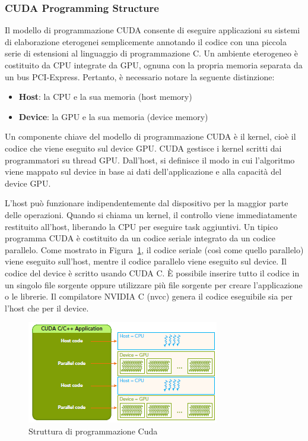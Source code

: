 \subsubsection{CUDA Programming Structure}
Il modello di programmazione CUDA consente di eseguire applicazioni su sistemi di elaborazione eterogenei semplicemente annotando il codice con una piccola serie di estensioni al linguaggio di programmazione C. Un ambiente eterogeneo è costituito da CPU integrate da GPU, ognuna con la propria memoria separata da un bus PCI-Express. Pertanto, è necessario notare la seguente distinzione:
\begin{itemize}
	\item \textbf{Host}: la CPU e la sua memoria (host memory)
	\item \textbf{Device}: la GPU e la sua memoria (device memory)
\end{itemize}
Un componente chiave del modello di programmazione CUDA è il kernel, cioè il codice che viene eseguito sul device GPU. CUDA gestisce i kernel scritti dai programmatori su thread GPU. Dall'host, si definisce il modo in cui l'algoritmo viene mappato sul device in base ai dati dell'applicazione e alla capacità del device GPU. 

L'host può funzionare indipendentemente dal dispositivo per la maggior parte delle operazioni. Quando si chiama un kernel, il controllo viene immediatamente restituito all'host, liberando la CPU per eseguire task aggiuntivi. Un tipico programma CUDA è costituito da un codice seriale integrato da un codice parallelo. Come mostrato in Figura~\ref{fig:Cuda_programming_structure}, il codice seriale (così come quello parallelo) viene eseguito sull'host, mentre il codice parallelo viene eseguito sul device. Il codice del device è scritto usando CUDA C. È possibile inserire tutto il codice in un singolo file sorgente oppure utilizzare più file sorgente per creare l'applicazione o le librerie. Il compilatore NVIDIA C (nvcc) genera il codice eseguibile sia per l'host che per il device.
\begin{figure}[H]
	\centering
	\includegraphics[width=.75\textwidth]{Immagini/CUDA/Cuda_programming_structure}
	\caption{Struttura di programmazione Cuda \cite{Cheng:ProfessionalCudaProgramming}}
	\label{fig:Cuda_programming_structure}
\end{figure}

